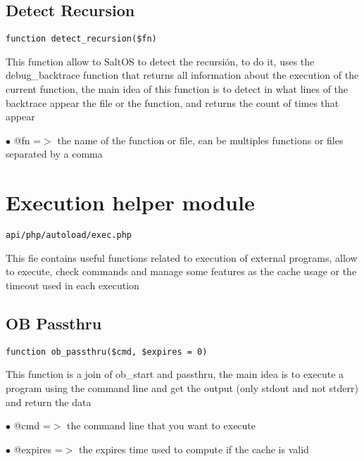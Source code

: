 \documentclass[a4paper]{book}
\begin{document}
\hypertarget{toc115}{}
\subsection{Detect Recursion}

\begin{lstlisting}
function detect_recursion($fn)
\end{lstlisting}

This function allow to SaltOS to detect the recursión, to do it, uses the debug\_backtrace
function that returns all information about the execution of the current function, the
main idea of this function is to detect in what lines of the backtrace appear the file
or the function, and returns the count of times that appear

\begin{compactitem}
\item[\color{myblue}$\bullet$] @fn =$>$ the name of the function or file, can be multiples functions or files separated
       by a comma
\end{compactitem}

\hypertarget{toc116}{}
\section{Execution helper module}

\begin{lstlisting}
api/php/autoload/exec.php
\end{lstlisting}

This fie contains useful functions related to execution of external programs, allow to execute,
check commands and manage some features as the cache usage or the timeout used in each execution

\hypertarget{toc117}{}
\subsection{OB Passthru}

\begin{lstlisting}
function ob_passthru($cmd, $expires = 0)
\end{lstlisting}

This function is a join of ob\_start and passthru, the main idea
is to execute a program using the command line and get the
output (only stdout and not stderr) and return the data

\begin{compactitem}
\item[\color{myblue}$\bullet$] @cmd     =$>$ the command line that you want to execute
\item[\color{myblue}$\bullet$] @expires =$>$ the expires time used to compute if the cache is valid
\end{compactitem}
\end{document}

